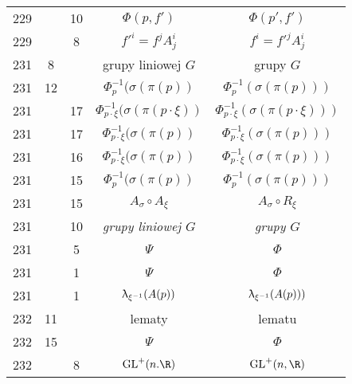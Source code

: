 \documentclass[a4paper,11pt]{article}
\begin{document}
\begin{center}
\begin{tabular}{|c|c|c|c|c|}
    229 & & 10 & $\Phi( p, f' )$ & $\Phi( p', f' )$ \\
    229 & &  8 & $f'^{ i } = f^{ j } A^{ i }_{ j }$
           & $f^{ i } = f'^{ j } A^{ i }_{ j }$ \\
    231 &  8 & & grupy liniowej $G$ & grupy $G$ \\
    231 & 12 & & $\Phi^{ -1 }_{ p }( \sigma( \pi( p ) )$
           & $\Phi^{ -1 }_{ p }( \sigma( \pi( p ) ) )$ \\
    231 & & 17 & $\Phi^{ -1 }_{ p \cdot \xi }( \sigma( \pi( p \cdot \xi ) )$
           & $\Phi^{ -1 }_{ p \cdot \xi }( \sigma( \pi( p \cdot \xi ) ) )$ \\
    231 & & 17 & $\Phi^{ -1 }_{ p \cdot \xi }( \sigma( \pi( p ) )$
           & $\Phi^{ -1 }_{ p \cdot \xi }( \sigma( \pi( p ) ) )$ \\
    231 & & 16 & $\Phi^{ -1 }_{ p \cdot \xi }( \sigma( \pi( p ) )$
           & $\Phi^{ -1 }_{ p \cdot \xi }( \sigma( \pi( p ) ) )$ \\
    231 & & 15 & $\Phi^{ -1 }_{ p }( \sigma( \pi( p ) )$
           & $\Phi^{ -1 }_{ p }( \sigma( \pi( p ) ) )$ \\
    231 & & 15 & $A_{ \sigma } \circ A_{ \xi }$
           & $A_{ \sigma } \circ R_{ \xi }$ \\
    231 & & 10 & \emph{grupy liniowej $G$} & \emph{grupy $G$} \\
    231 & &  5 & $\Psi$ & $\Phi$ \\
    231 & &  1 & $\Psi$ & $\Phi$ \\
    231 & &  1 & $\uplambda_{ \xi^{ -1 } }( A( p ) )$
           & $\uplambda_{ \xi^{ -1 } }( A( p ) ) )$ \\
    232 & 11 & & lematy & lematu \\
    232 & 15 & & $\Psi$ & $\Phi$ \\
    232 & & 8 & $\GL^{ + }( n. \R )$ & $\GL^{ + }( n, \R )$ \\
    \hline
  \end{tabular}


\end{center}
\end{document}
